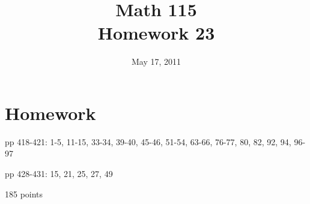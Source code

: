 \documentclass[fleqn,addpoints]{exam}
\title{Math 115 \\ Homework 23}
\date{May 17, 2011}
\begin{document}
\maketitle




\section{Homework}
\begin{itemize*}
  \item pp 418-421: 1-5, 11-15, 33-34, 39-40, 45-46, 51-54, 63-66, 76-77, 80, 82, 92, 94, 96-97
  \item pp 428-431: 15, 21, 25, 27, 49
\end{itemize*}

185 points
\end{document}
